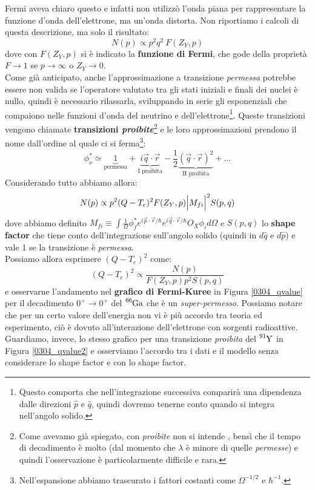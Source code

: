 \noindent Fermi aveva chiaro questo e infatti non utilizzò l'onda piana per rappresentare la funzione d'onda dell'elettrone, ma un'onda distorta. Non riportiamo i calcoli di questa descrizione, ma solo il risultato:
$$N(p)\propto p^2q^2\: F(Z_Y,p)$$
dove con $F(Z_Y,p)$ si è indicato la \textbf{funzione di Fermi}, che gode della proprietà $F\to 1$ se $p\to\infty$ o $Z_Y\to0$.\\
Come già anticipato, anche l'approssimazione a transizione \textit{permessa} potrebbe essere non valida se l'operatore valutato tra gli stati iniziali e finali dei nuclei è nullo, quindi è necessario rilassarla, sviluppando in serie gli esponenziali che compaiono nelle funzioni d'onda del neutrino e dell'elettrone\footnote{Questo comporta che nell'integrazione successiva comparirà una dipendenza dalle direzioni $\hat{p}$ e $\hat{q}$, quindi dovremo tenerne conto quando si integra nell'angolo solido.}. Queste transizioni vengono chiamate \textbf{transizioni \textit{proibite}}\footnote{Come avevamo già spiegato, con \textit{proibite} non si intende , bensì che il tempo di decadimento è molto  (dal momento che $\lambda$ è minore di quelle \textit{permesse}) e quindi l'osservazione è particolarmente difficile e rara.} e le loro approssimazioni prendono il nome dall'ordine al quale ci si ferma\footnote{Nell'espansione abbiamo trascurato i fattori costanti come $\Omega^{-1/2}$ e $\hbar^{-1}$.}:
$$\phi_\nu^* \simeq \underbrace{1}_\text{permessa}+\underbrace{i\vec{q}\cdot \vec{r}}_\text{I proibita}-\frac{1}{2}\underbrace{(\vec{q}\cdot \vec{r})^2}_\text{II proibita}+\dots$$
Considerando tutto abbiamo allora:
$$N(p)\propto p^2(Q-T_e)^2 F(Z_Y,p)\Bigl |M_{fi}\Bigl |^2 S(p,q)$$
dove abbiamo definito $M_{fi}\equiv \int \frac{1}{\Omega} \phi^*_f e^{i\vec{p}\cdot\vec{r}/\hbar} e^{i\vec{q}\cdot\vec{r}/\hbar} O_X \phi_i d\Omega $ e $S(p,q)$ lo \textbf{shape factor} che tiene conto dell'integrazione sull'angolo solido (quindi in $d\hat{q}$ e $d\hat{p}$) e vale 1 se la transizione è \textit{permessa}.\\
Possiamo allora esprimere $(Q-T_e)^2$ come:
$$(Q-T_e)^2\propto\frac{N(p)}{F(Z_Y,p)p^2 S(p,q)}$$
e osservarne l'andamento nel \textbf{grafico di Fermi-Kuree} in Figura \ref{0304_qvalue} per il decadimento $0^+\to0^+$ del $\ce{^{66}Ga}$ che è un \textit{super-permesso}. Possiamo notare che per un certo valore dell'energia non vi è più accordo tra teoria ed esperimento, ciò è dovuto all'interazione dell'elettrone con sorgenti radioattive.\\
Guardiamo, invece, lo stesso grafico per una transizione \textit{proibita} del $\ce{^{91}Y}$ in Figura \ref{0304_qvalue2} e osserviamo l'accordo tra i dati e il modello senza considerare lo shape factor e con lo shape factor.

